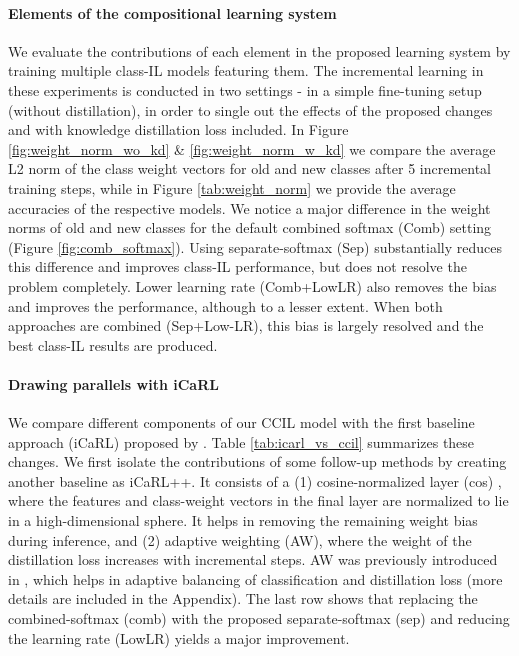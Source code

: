 \documentclass[final]{cvpr}
\newcommand{\ilkd}{CCIL }
\begin{document}
\paragraph{Elements of the compositional learning system}
We evaluate the contributions of each element in the proposed learning system by training multiple class-IL models featuring them. 
The incremental learning in these experiments is conducted in two settings - in a simple fine-tuning setup (without distillation), in order to single out the effects of the proposed changes and with knowledge distillation loss included. 
In Figure \ref{fig:weight_norm_wo_kd} \& \ref{fig:weight_norm_w_kd} we compare the average L2 norm of the class weight vectors for old and new classes after 5 incremental training steps, while in Figure \ref{tab:weight_norm} we provide the average accuracies of the respective models. We notice a major difference in the weight norms of old and new classes for the default combined softmax (Comb) setting (Figure  \ref{fig:comb_softmax}). Using separate-softmax (Sep) substantially reduces this difference and improves class-IL performance, but does not resolve the problem completely.
Lower learning rate (Comb+LowLR) also removes the bias and improves the performance, although to a lesser extent.
When both approaches are combined (Sep+Low-LR), this bias is largely resolved and the best class-IL results are produced.



\paragraph{Drawing parallels with iCaRL}
We compare different components of our \ilkd model with the first baseline approach (iCaRL) proposed by \cite{icarl}. Table \ref{tab:icarl_vs_ccil} summarizes these changes. 
We first isolate the contributions of some follow-up methods by creating another baseline as iCaRL++. It consists of a (1) cosine-normalized layer (cos) \cite{Gidaris_2018_CVPR, DBLP:conf/icann/LuoZXWRY18, lucir}, where the features and class-weight vectors in the final layer are normalized to lie in a high-dimensional sphere. It helps in removing the remaining weight bias during inference, and (2) adaptive weighting (AW), where the weight of the distillation loss increases with incremental steps. AW was previously introduced in \cite{lucir}, which helps in adaptive balancing of classification and distillation loss (more details are included in the Appendix).
The last row shows that replacing the combined-softmax (comb) with the proposed separate-softmax (sep) and reducing the learning rate (LowLR) yields a major improvement.
\end{document}
